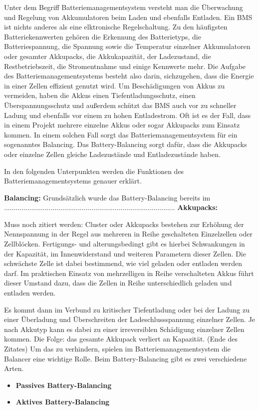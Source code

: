 Unter dem Begriff Batteriemanagementsystem versteht man die Überwachung und Regelung von Akkumulatoren beim Laden und ebenfalls Entladen. Ein BMS ist nichts anderes als eine elktronische Regelschaltung. Zu den häufigsten Batteriekennwerten gehören die Erkennung des Batterietyps, die Batteriespannung, die Spannung sowie die Temperatur einzelner Akkumulatoren oder gesamter Akkupacks, die Akkukapazität, der Ladezustand, die Restbetriebszeit, die Stromentnahme und einige Kennwerte mehr. Die Aufgabe des Batteriemanagementsystems besteht also darin, sichzugehen, dass die Energie in einer Zellen effizient genutzt wird. Um Beschädigungen von Akkus zu vermeiden, haben die Akkus einen Tiefentladungsschutz, einen Überspannungsschutz und außerdem schützt das BMS auch vor zu schneller Ladung und ebenfalls vor einem zu hohen Entladestrom. Oft ist es der Fall, dass in einem Projekt mehrere einzelne Akkus oder sogar Akkupacks zum Einsatz kommen. In einem solchen Fall sorgt das Batteriemanagementsystem für ein sogenanntes Balancing. Das Battery-Balancing sorgt dafür, dass die Akkupacks oder einzelne Zellen gleiche Ladezustände und Entladezustände haben. 

In den folgenden Unterpunkten werden die Funktionen des Batteriemanagementsystems genauer erklärt.

\textbf{Balancing:}
Grundsätzlich wurde das Battery-Balancing bereits im ........................................................................................
\textbf{Akkupacks:}

Muss noch zitiert werden: Cluster oder Akkupacks bestehen zur Erhöhung der Nennspannung in der Regel aus mehreren in Reihe geschalteten Einzelzellen oder Zellblöcken. Fertigungs- und alterungsbedingt gibt es hierbei Schwankungen in der Kapazität, im Innenwiderstand und weiteren Parametern dieser Zellen. Die schwächste Zelle ist dabei bestimmend, wie viel geladen oder entladen werden darf. Im praktischen Einsatz von mehrzelligen in Reihe verschalteten Akkus führt dieser Umstand dazu, dass die Zellen in Reihe unterschiedlich geladen und entladen werden.

Es kommt dann im Verbund zu kritischer Tiefentladung oder bei der Ladung zu einer Überladung und Überschreiten der Ladeschlussspannung einzelner Zellen. Je nach Akkutyp kann es dabei zu einer irreversiblen Schädigung einzelner Zellen kommen. Die Folge: das gesamte Akkupack verliert an Kapazität. (Ende des Zitates)
Um das zu verhindern, spielen im Batteriemanagementsystem die Balancer eine wichtige Rolle. Beim Battery-Balancing gibt es zwei verschiedene Arten. 
\begin{itemize}
\item \textbf{Passives Battery-Balancing} \medskip\\
\item \textbf{Aktives Battery-Balancing} \medskip\\
\end{itemize}


